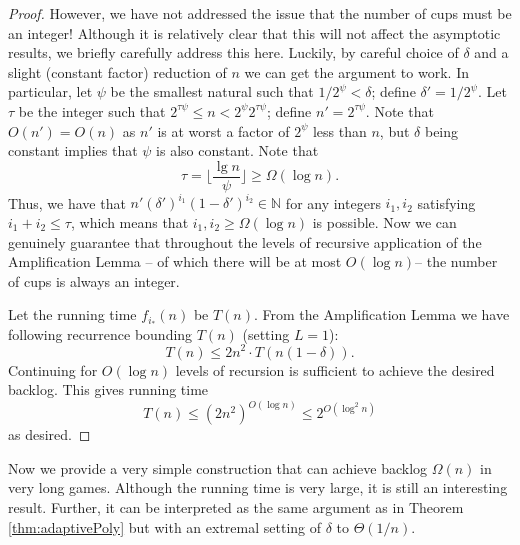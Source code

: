 \documentclass[twocolumn]{article}[10pt]
\begin{document}
\begin{proof}
  However, we have not addressed the issue that the number of cups must be an
  integer! Although it is relatively clear that this will not affect the
  asymptotic results, we briefly carefully address this here. Luckily, by
  careful choice of $\delta$ and a slight (constant factor) reduction of $n$ we can get the
  argument to work. In particular, let $\psi$ be the smallest natural such that
  $1/2^\psi < \delta$; define $\delta' = 1/2^\psi$. Let $\tau$ be the integer
  such that $2^{\tau \psi} \le n < 2^\psi 2^{\tau \psi}$; define $n' =
  2^{\tau\psi}$. Note that $O(n') = O(n)$ as $n'$ is at worst a factor of
  $2^\psi$ less than $n$, but $\delta$ being constant implies that $\psi$ is
  also constant. Note that $$\tau = \Big\lfloor \frac{\lg n}{\psi} \Big\rfloor \ge \Omega(\log n).$$
  Thus, we have that $n'(\delta')^{i_1}(1-\delta')^{i_2} \in \mathbb{N}$ for any
  integers $i_1,i_2$ satisfying $i_1+i_2 \le \tau$, which means that $i_1,i_2\ge \Omega(\log n)$ is possible.
  Now we can genuinely guarantee that throughout the levels of recursive application of
  the Amplification Lemma -- of which there will be at most $O(\log n)$-- the
  number of cups is always an integer. 

  Let the running time $f_{i_*}(n)$ be $T(n)$. From the Amplification Lemma we have 
  following recurrence bounding $T(n)$ (setting $L=1$):
  $$T(n) \le 2n^2 \cdot T(n(1-\delta)).$$
  Continuing for $O(\log n)$ levels of recursion is sufficient to
  achieve the desired backlog. This gives running time
  $$T(n) \le (2n^2)^{O(\log n)} \le 2^{O(\log^2 n)}$$
  as desired.

\end{proof}

Now we provide a very simple construction that can achieve backlog $\Omega(n)$
in very long games. Although the running time is very large, it is
still an interesting result. Further, it can be interpreted as the same
argument as in Theorem \ref{thm:adaptivePoly} but with an extremal setting of
$\delta$ to $\Theta(1/n)$.
\end{document}
